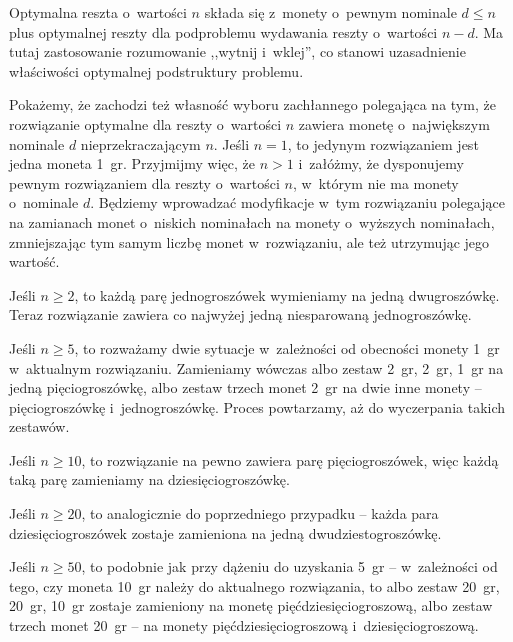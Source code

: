 
\subproblem %
Optymalna reszta o~wartości $n$ składa się z~monety o~pewnym nominale $d\le n$ plus optymalnej reszty dla podproblemu wydawania reszty o~wartości $n-d$.
Ma tutaj zastosowanie rozumowanie ,,wytnij i~wklej'', co stanowi uzasadnienie właściwości optymalnej podstruktury problemu.

Pokażemy, że zachodzi też własność wyboru zachłannego polegająca na tym, że rozwiązanie optymalne dla reszty o~wartości $n$ zawiera monetę o~największym nominale $d$ nieprzekraczającym $n$.
Jeśli $n=1$, to jedynym rozwiązaniem jest jedna moneta 1~gr.
Przyjmijmy więc, że $n>1$ i~załóżmy, że dysponujemy pewnym rozwiązaniem dla reszty o~wartości $n$, w~którym nie ma monety o~nominale $d$.
Będziemy wprowadzać modyfikacje w~tym rozwiązaniu polegające na zamianach monet o~niskich nominałach na monety o~wyższych nominałach, zmniejszając tym samym liczbę monet w~rozwiązaniu, ale też utrzymując jego wartość.

Jeśli $n\ge2$, to każdą parę jednogroszówek wymieniamy na jedną dwugroszówkę.
Teraz rozwiązanie zawiera co najwyżej jedną niesparowaną jednogroszówkę.

Jeśli $n\ge5$, to rozważamy dwie sytuacje w~zależności od obecności monety 1~gr w~aktualnym rozwiązaniu.
Zamieniamy wówczas albo zestaw 2~gr, 2~gr, 1~gr na jedną pięciogroszówkę, albo zestaw trzech monet 2~gr na dwie inne monety -- pięciogroszówkę i~jednogroszówkę.
Proces powtarzamy, aż do wyczerpania takich zestawów.

Jeśli $n\ge10$, to rozwiązanie na pewno zawiera parę pięciogroszówek, więc każdą taką parę zamieniamy na dziesięciogroszówkę.

Jeśli $n\ge20$, to analogicznie do poprzedniego przypadku -- każda para dziesięciogroszówek zostaje zamieniona na jedną dwudziestogroszówkę.

Jeśli $n\ge50$, to podobnie jak przy dążeniu do uzyskania 5~gr -- w~zależności od tego, czy moneta 10~gr należy do aktualnego rozwiązania, to albo zestaw 20~gr, 20~gr, 10~gr zostaje zamieniony na monetę pięćdziesięciogroszową, albo zestaw trzech monet 20~gr -- na monety pięćdziesięciogroszową i~dziesięciogroszową.

